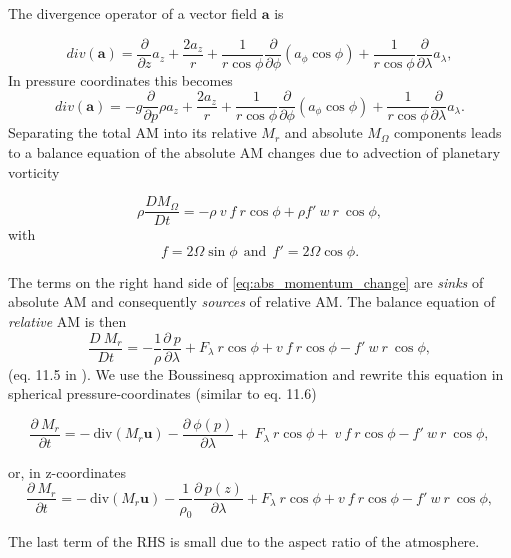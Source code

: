 \documentclass[11pt]{article}
\numberwithin{equation}{section}
\newcommand{\beq}{\begin{equation}}
\newcommand{\eeq}{\end{equation}}
\newcommand{\beqs}{\begin{equation*}}
\newcommand{\eeqs}{\end{equation*}}
\newcommand{\vect}[1]{\boldsymbol{#1}}
\newcommand{\Dt}[1]{\frac{D#1}{D t}}
\newcommand{\cphi}{\cos \phi}
\begin{document}
The divergence operator of a vector field $\vect a$ is 

\beq
div(\vect a ) = \frac{\partial}{\partial z} a_z + \frac{2 a_z}{r} + \frac{1}{r \cos{\phi}}  \frac{\partial}{\partial \phi} ( a_{\phi} \cos{\phi}) + \frac{1}{r \cos{\phi}} \frac{\partial}{\partial \lambda} a_\lambda, 
\eeq
In pressure coordinates this becomes
\beq
div(\vect a ) = - g \frac{\partial}{\partial p } \rho a_z + \frac{2 a_z}{r} + \frac{1}{r \cos{\phi}}  \frac{\partial}{\partial \phi} ( a_{\phi} \cos{\phi}) + \frac{1}{r \cos{\phi}} \frac{\partial}{\partial \lambda} a_\lambda.
\eeq
%
%
%
Separating the total AM into its relative $M_r$ and absolute $M_\Omega$ components leads to a balance equation of the absolute AM changes due to advection of planetary vorticity

\beq \label{eq:abs_momentum_change}
\rho \Dt {M_\Omega} = - \rho ~ v ~ f ~r \cphi + \rho f' ~ w~ r ~ \cphi, 
\eeq
with  
\beqs
f  = 2 \Omega \sin \phi ~~\text{and}~~  f' = 2 \Omega \cphi.
\eeqs


The terms on the right hand side of \eqref{eq:abs_momentum_change} are {\it sinks} of absolute AM and consequently {\it sources} of relative AM. The balance equation of {\it relative} AM is then
\beq
\frac{D ~M_r}{D t}  = -   \frac{1}{\rho} \frac{\partial~p}{\partial \lambda} + F_\lambda~ r \cphi +  v ~ f ~r \cphi - f' ~ w~ r ~ \cphi, 
\eeq
(eq. 11.5 in \citet{Peixoto2008}). We use the Boussinesq approximation and rewrite this equation in spherical pressure-coordinates (similar to \citet{Peixoto2008} eq. 11.6) 

\beq \label{eq:rel_momentum_conservation}
\frac{\partial ~ M_r}{\partial t}  = -~\text{div}(M_r \vect u) - \frac{\partial~\phi(p)}{\partial \lambda} + ~F_\lambda~ r \cphi +  ~ v ~ f ~r \cphi - f' ~ w~ r ~ \cphi, 
\eeq

or, in z-coordinates
\beqs
\frac{\partial ~M_r}{\partial t}  = - ~\text{div}( M_r \vect u)-   \frac{1}{\rho_0} \frac{\partial~p(z)}{\partial \lambda} + F_\lambda~ r \cphi +  v ~ f ~r \cphi - f' ~ w~ r ~ \cphi,
\eeqs
\par
The last term of the RHS is small due to the aspect ratio of the atmosphere. %
\end{document}
